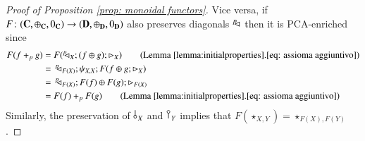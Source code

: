 \begin{proof}[Proof of Proposition \ref{prop: monoidal functors}]
Vice versa, if $F\colon(\mathbf{C},\oplus_{\mathbf{C}},0_{\mathbf{C}})\to (\mathbf{D},\oplus_{\mathbf{D}},0_{\mathbf{D}})$ also preserves diagonals $^p\!\! \lhd_{}$ then it is PCA-enriched since
\begin{align}
    F(f+_pg)&= F(\diagp{X};(f\piu g);\codiag{X}) \tag{Lemma \ref{lemma:initialproperties}.\ref{eq: assioma aggiuntivo}}\\
    &=\, \diagp{F(X)};\psi_{X,X};F(f\piu g; \codiag{X}) \tag*{}\\
&=\, \diagp{F(X)};F(f)\piu F(g);\codiag{F(X)}\tag*{}\\
&= F(f)+_p F(g) \tag{Lemma \ref{lemma:initialproperties}.\ref{eq: assioma aggiuntivo}}
\end{align}
 Similarly, the preservation of $\,\bangp{X}$ and $\cobang{Y}$ implies that $ F(\star_{X,Y})= \star_{F(X),F(Y)}$.

\end{proof}














